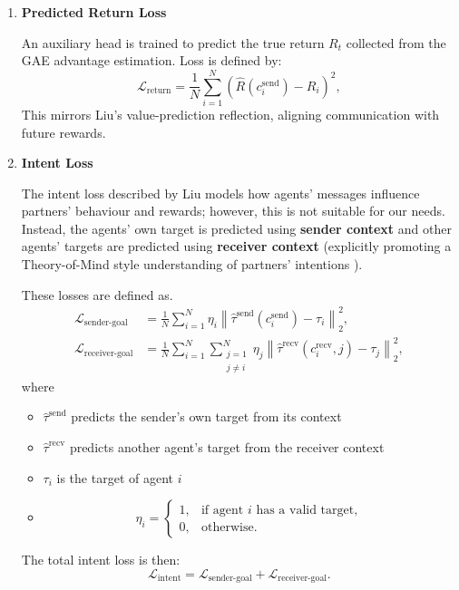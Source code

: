 \begin{enumerate}
    \item \textbf{Predicted Return Loss}
    
    An auxiliary head is trained to predict the true return $R_t$ collected from the GAE advantage estimation.
    Loss is defined by:
    \begin{equation}
        \mathcal{L}_{\text{return}} = \frac{1}{N} \sum_{i=1}^{N} \left( \hat{R}(c^{\text{send}}_{i}) - R_{i} \right)^2,
    \end{equation}
    This mirrors Liu's value-prediction reflection, aligning communication with future rewards.

    \item \textbf{Intent Loss}
    
    The intent loss described by Liu models how agents' messages influence partners' behaviour and rewards; however, this is not suitable for our needs.
    Instead, the agents' own target is predicted using \textbf{sender context} and other agents' targets are predicted using \textbf{receiver context} (explicitly promoting a Theory-of-Mind style understanding of partners' intentions \cite{machine-tom, tom}).

    These losses are defined as.
    \begin{align}
        \mathcal{L}_{\text{sender-goal}} &= \frac{1}{N}\sum_{i=1}^{N} 
        \eta_{i} \left\| \hat{\tau}^{\text{send}}(c^{\text{send}}_{i}) - \tau_{i} \right\|_2^2, \\
        \mathcal{L}_{\text{receiver-goal}} &= \frac{1}{N} \sum_{i=1}^{N} \sum_{\substack{j=1 \\ j \neq i}}^{N}
        \eta_{j} \left\| \hat{\tau}^{\text{recv}}(c^{\text{recv}}_{i}, j) - \tau_{j} \right\|_2^2,
    \end{align}
    where 
    \begin{itemize}[noitemsep, topsep=0pt]
        \item $\hat{\tau}^{\text{send}}$ predicts the sender's own target from its context
        \item $\hat{\tau}^{\text{recv}}$ predicts another agent's target from the receiver context
        \item $\tau_i$ is the target of agent $i$
        \item \[
            \eta_i =
            \begin{cases}
                1, & \text{if agent } i \text{ has a valid target}, \\
                0, & \text{otherwise}.
            \end{cases}
            \]
    \end{itemize}

    The total intent loss is then:
    \begin{equation}
        \mathcal{L}_{\text{intent}} = \mathcal{L}_{\text{sender-goal}} + \mathcal{L}_{\text{receiver-goal}}.
    \end{equation}

\end{enumerate}

